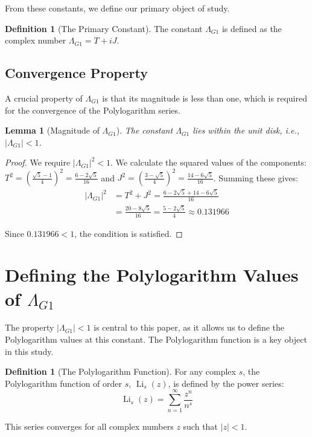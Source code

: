 \documentclass{amsart}
\theoremstyle{plain}
\newtheorem{lemma}[theorem]{Lemma}
\theoremstyle{definition}
\newtheorem{definition}[theorem]{Definition}
\theoremstyle{remark}
\DeclareMathOperator{\Li}{Li} %
\newcommand{\LambdaG}{\Lambda_{G1}}
\begin{document}
From these constants, we define our primary object of study.
\begin{definition}[The Primary Constant]
The constant $\LambdaG$ is defined as the complex number $\LambdaG = T+iJ$.
\end{definition}

\subsection{Convergence Property}
A crucial property of $\LambdaG$ is that its magnitude is less than one, which is required for the convergence of the Polylogarithm series.
\begin{lemma}[Magnitude of $\LambdaG$]
\label{lem:convergence}
The constant $\LambdaG$ lies within the unit disk, i.e., $|\LambdaG| < 1$.
\end{lemma}
\begin{proof}
We require $|\LambdaG|^2 < 1$. We calculate the squared values of the components: $T^2 = \left(\frac{\sqrt{5}-1}{4}\right)^2 = \frac{6-2\sqrt{5}}{16}$ and $J^2 = \left(\frac{3-\sqrt{5}}{4}\right)^2 = \frac{14-6\sqrt{5}}{16}$. Summing these gives:
\begin{align*}
    |\LambdaG|^2 &= T^2+J^2 = \frac{6-2\sqrt{5} + 14-6\sqrt{5}}{16} \\
                 &= \frac{20-8\sqrt{5}}{16} = \frac{5-2\sqrt{5}}{4} \approx 0.131966
\end{align*} 

Since $0.131966 < 1$, the condition is satisfied.
\qedhere
\end{proof}

\section{Defining the Polylogarithm Values of \texorpdfstring{$\LambdaG$}{Lambda\_G1}}
The property $|\LambdaG| < 1$ is central to this paper, as it allows us to define the Polylogarithm values at this constant. The Polylogarithm function is a key object in this study.
\begin{definition}[The Polylogarithm Function]
For any complex $s$, the Polylogarithm function of order $s$, $\Li_s(z)$, is defined by the power series:
$$ \Li_s(z) = \sum_{n=1}^{\infty} \frac{z^n}{n^s} $$ 

This series converges for all complex numbers $z$ such that $|z|<1$.
\end{definition}
\end{document}
